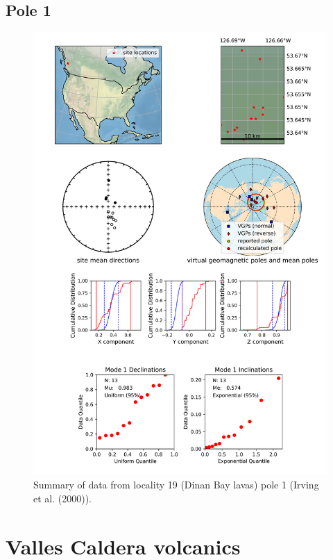 \subsection{Pole 1}


\begin{figure}[H]
\centering
\includegraphics[width=5 in]{./19/1/pole_summary.png}
\caption{Summary of data from locality 19 (Dinan Bay lavas) pole 1 (Irving et al. (2000)).}
\end{figure}

\section{Valles Caldera volcanics}
